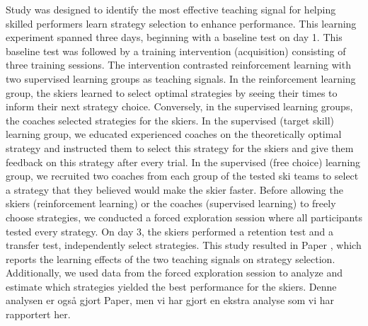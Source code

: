 Study  was designed to identify the most effective teaching signal for helping skilled performers learn strategy selection to enhance performance. This learning experiment spanned three days, beginning with a baseline test on day 1. This baseline test was followed by a training intervention (acquisition) consisting of three training sessions. The intervention contrasted reinforcement learning with two supervised learning groups as teaching signals. In the reinforcement learning group, the skiers learned to select optimal strategies by seeing their times to inform their next strategy choice. Conversely, in the supervised learning groups, the coaches selected strategies for the skiers. In the supervised (target skill) learning group, we educated experienced coaches on the theoretically optimal strategy and instructed them to select this strategy for the skiers and give them feedback on this strategy after every trial. In the supervised (free choice) learning group, we recruited two coaches from each group of the tested ski teams to select a strategy that they believed would make the skier faster. Before allowing the skiers (reinforcement learning) or the coaches (supervised learning) to freely choose strategies, we conducted a forced exploration session where all participants tested every strategy. On day 3, the skiers performed a retention test and a transfer test, independently select strategies. This study resulted in Paper , which reports the learning effects of the two teaching signals on strategy selection. Additionally, we used data from the forced exploration session to analyze and estimate which strategies yielded the best performance for the skiers. Denne analysen er også gjort Paper, men vi har gjort en ekstra analyse som vi har rapportert her. 


